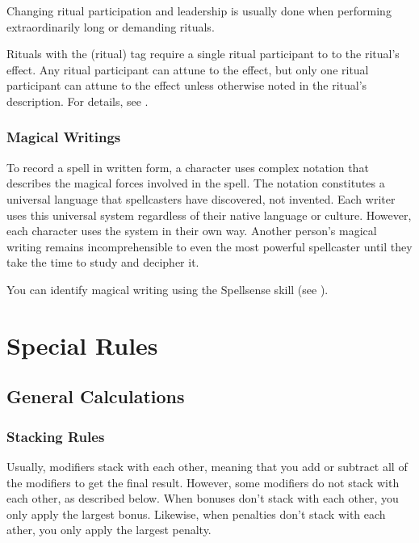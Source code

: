             Changing ritual participation and leadership is usually done when performing extraordinarily long or demanding rituals.

                Rituals with the  (ritual) tag require a single ritual participant to  to the ritual's effect.
                Any ritual participant can attune to the effect, but only one ritual participant can attune to the effect unless otherwise noted in the ritual's description.
                For details, see .

        \subsubsection{Magical Writings}
            To record a spell in written form, a character uses complex notation that describes the magical forces involved in the spell.
            The notation constitutes a universal language that spellcasters have discovered, not invented.
            Each writer uses this universal system regardless of their native language or culture.
            However, each character uses the system in their own way.
            Another person's magical writing remains incomprehensible to even the most powerful spellcaster until they take the time to study and decipher it.

            You can identify magical writing using the Spellsense skill (see ).

\section{Special Rules}

    \subsection{General Calculations}

        \subsubsection{Stacking Rules}\label{Stacking Rules}
            Usually, modifiers stack with each other, meaning that you add or subtract all of the modifiers to get the final result.
            However, some modifiers do not stack with each other, as described below.
            When bonuses don't stack with each other, you only apply the largest bonus.
            Likewise, when penalties don't stack with each ather, you only apply the largest penalty.

